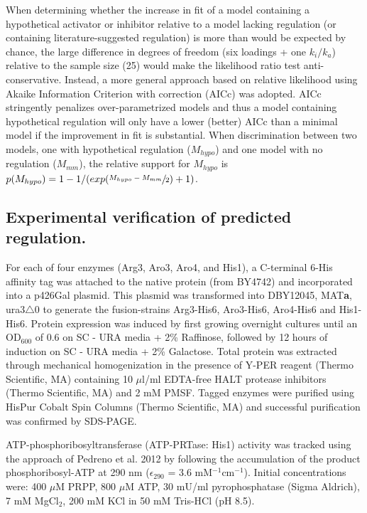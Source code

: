 When determining whether the increase in fit of a model containing a hypothetical activator or inhibitor relative to a model lacking regulation (or containing literature-suggested regulation) is more than would be expected by chance, the large difference in degrees of freedom (six loadings + one $k_{i}/k_{a}$) relative to the sample size (25) would make the likelihood ratio test anti-conservative.  Instead, a more general approach based on relative likelihood using Akaike Information Criterion with correction (AICc) was adopted.  AICc stringently penalizes over-parametrized models and thus a model containing hypothetical regulation will only have a lower (better) AICc than a minimal model if the improvement in fit is substantial.  When discrimination between two models, one with hypothetical regulation ($M_{hypo}$) and one model with no regulation ($M_{mm}$), the relative support for $M_{hypo}$ is $p(M_{hypo}) = 1 - 1/(exp(\sfrac{M_{hypo} - M_{mm}}{2}) + 1)$.

\subsection{Experimental verification of predicted regulation.}

For each of four enzymes (Arg3, Aro3, Aro4, and His1), a C-terminal 6-His affinity tag was attached to the native protein (from BY4742) and incorporated into a p426Gal plasmid.  This plasmid was transformed into DBY12045, MAT\textbf{a}, ura3$\bigtriangleup$0 to generate the fusion-strains Arg3-His6, Aro3-His6, Aro4-His6 and His1-His6.  Protein expression was induced by first growing overnight cultures until an OD$_{600}$ of 0.6 on SC - URA media + 2\% Raffinose, followed by 12 hours of induction on SC - URA media + 2\% Galactose.  Total protein was extracted through mechanical homogenization in the presence of Y-PER reagent (Thermo Scientific, MA) containing 10 $\mu$l/ml EDTA-free HALT protease inhibitors (Thermo Scientific, MA) and 2 mM PMSF.  Tagged enzymes were purified using HisPur Cobalt Spin Columns (Thermo Scientific, MA) and successful purification was confirmed by SDS-PAGE.

ATP-phosphoribosyltransferase (ATP-PRTase: His1) activity was tracked using the approach of Pedreno et al. 2012 \cite{Pedreno:2012hv} by following the accumulation of the product phosphoribosyl-ATP at 290 nm ($\epsilon_{290}$ = 3.6 mM$^{-1}$cm$^{-1}$).  Initial concentrations were: 400 $\mu$M PRPP, 800 $\mu$M ATP, 30 mU/ml pyrophosphatase (Sigma Aldrich), 7 mM MgCl$_{2}$, 200 mM KCl in 50 mM Tris-HCl (pH 8.5).

